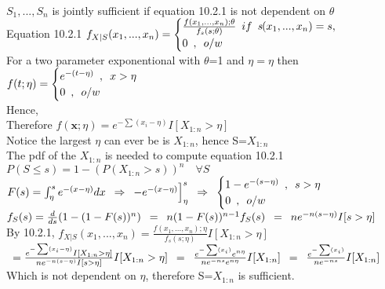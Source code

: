 
\\

$S_1,...,S_n$ is jointly sufficient if equation 10.2.1 is not dependent on $\theta$ \\

Equation 10.2.1 \quad $f_{X|S}(x_1,...,x_n) = \begin{cases} \frac{f(x_1,...,x_n);\theta}{f_s(s;\theta)} \enskip if \enskip \emph{s} (x_1,...,x_n) = s, \\
0\enskip , \enskip o/w \end{cases}$\\
 
For a two parameter exponentional with $\theta$=1 and $\eta = \eta$ then \\

$f(t;\eta)=\begin{cases} e^{-(t-\eta)}\enskip ,\enskip x>\eta  \\
0\enskip ,\enskip o/w \end{cases}$ \\

Hence, \\

Therefore $f(\textbf{x};\eta) = e^{-\sum(x_i - \eta)}I[X_{1:n} >\eta]$ \\

Notice the largest $\eta$ can ever be is $X_{1:n}$, \enskip hence \enskip S=$X_{1:n}$ \\

The pdf of the $X_{1:n}$ is needed to compute equation 10.2.1 \\

$P(S \le s) = 1-(P(X_{1:n} > s))^n \quad \forall S$\\

$F(s) = \int_{\eta}^{s}e^{-(x- \eta )}dx \enskip \Rightarrow \enskip -e^{-(x- \eta)} \Big]_{\eta}^{s} \enskip \Rightarrow \enskip \begin{cases} 1-e^{-(s-\eta)}\enskip ,\enskip s>\eta  \\
0\enskip ,\enskip o/w \end{cases}$\\

$f_S(s) = \frac{d}{ds}(1-(1-F(s))^n) \enskip = \enskip n(1-F(s))^{n-1}f_S(s) \enskip = \enskip ne^{-n(s- \eta)}I[s > \eta]$\\

By 10.2.1, \enskip $f_{X|S}(x_1,...,x_n) =\frac{f(x_1,...,x_n);\eta}{f_s(s;\eta)}I[X_{1:n} >\eta]$ \\

$\enskip=\frac{e^{-\sum(x_i - \eta)}I[X_{1:n} >\eta]}{ne^{-n(s-\eta)}I[s > \eta]}I[X_{1:n} >\eta] \enskip = \enskip \frac{e^{-\sum(x_i)} e^{n\eta}}{ne^{-ns}e^{n\eta}}I[X_{1:n}] \enskip = \enskip \frac{e^{-\sum(x_i )}}{ne^{-ns}} I[X_{1:n}]$\\

Which is not dependent on $\eta$, therefore S=$X_{1:n}$ is sufficient.
